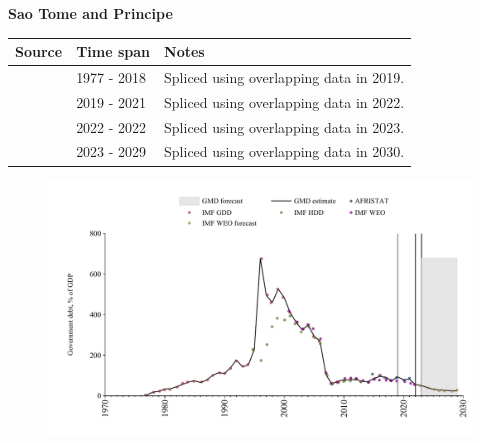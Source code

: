 \documentclass[12pt,a4paper,landscape]{article}
\begin{document}
\begin{adjustbox}{max totalsize={\paperwidth}{\paperheight},center}
\begin{minipage}[t][\textheight][t]{\textwidth}
\vspace*{0.5cm}
{}
\begin{center}
{\Large\bfseries Sao Tome and Principe}
\end{center}
\vspace{0.5cm}
\begin{table}[H]
\centering
\small
\begin{tabular}{|l|l|l|}
\hline
\textbf{Source} & \textbf{Time span} & \textbf{Notes} \\
\hline
\rowcolor{white}\cite{IMF_GDD}& 1977 - 2018 &Spliced using overlapping data in 2019.\\
\rowcolor{lightgray}\cite{AFRISTAT}& 2019 - 2021 &Spliced using overlapping data in 2022.\\
\rowcolor{white}\cite{IMF_WEO}& 2022 - 2022 &Spliced using overlapping data in 2023.\\
\rowcolor{lightgray}\cite{IMF_WEO_forecast}& 2023 - 2029 &Spliced using overlapping data in 2030.\\
\hline
\end{tabular}
\end{table}
\begin{figure}[H]
\centering
\includegraphics[width=\textwidth,height=0.6\textheight,keepaspectratio]{graphs/STP_govdebt_GDP.pdf}
\end{figure}
\end{minipage}
\end{adjustbox}
\end{document}
